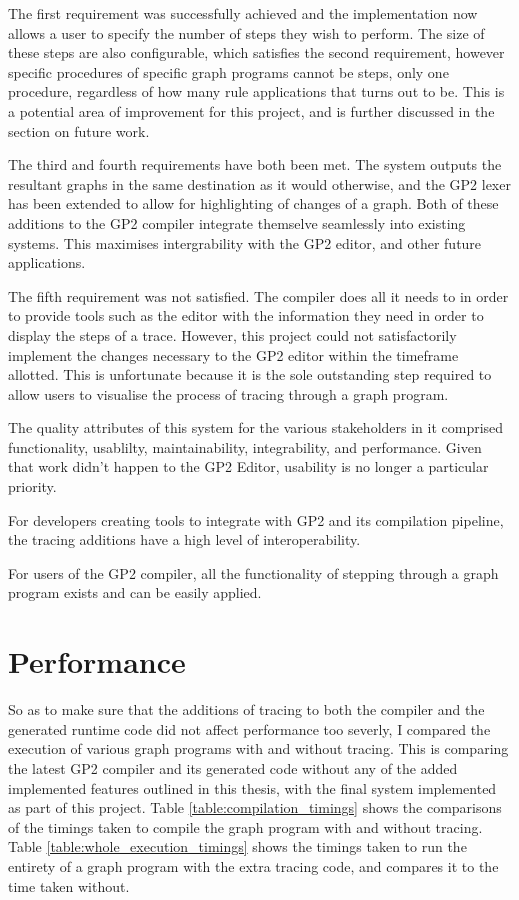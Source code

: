 \documentclass{UoYCSproject}
\begin{document}
The first requirement was successfully achieved and the implementation now allows a user to specify the number of steps they wish to perform. The size of these steps are also configurable, which satisfies the second requirement, however specific procedures of specific graph programs cannot be steps, only one procedure, regardless of how many rule applications that turns out to be. This is a potential area of improvement for this project, and is further discussed in the section on future work. %

The third and fourth requirements have both been met. The system outputs the resultant graphs in the same destination as it would otherwise, and the GP2 lexer has been extended to allow for highlighting of changes of a graph. Both of these additions to the GP2 compiler integrate themselve seamlessly into existing systems. This maximises intergrability with the GP2 editor, and other future applications.

The fifth requirement was not satisfied. The compiler does all it needs to in order to provide tools such as the editor with the information they need in order to display the steps of a trace. However, this project could not satisfactorily implement the changes necessary to the GP2 editor within the timeframe allotted. This is unfortunate because it is the sole outstanding step required to allow users to visualise the process of tracing through a graph program.

The quality attributes of this system for the various stakeholders in it comprised functionality, usablilty, maintainability, integrability, and performance. Given that work didn't happen to the GP2 Editor, usability is no longer a particular priority.

For developers creating tools to integrate with GP2 and its compilation pipeline, the tracing additions have a high level of interoperability.

For users of the GP2 compiler, all the functionality of stepping through a graph program exists and can be easily applied.

\section{Performance}

So as to make sure that the additions of tracing to both the compiler and the generated runtime code did not affect performance too severly, I compared the execution of various graph programs with and without tracing. This is comparing the latest GP2 compiler and its generated code without any of the added implemented features outlined in this thesis, with the final system implemented as part of this project. Table \ref{table:compilation_timings} shows the comparisons of the timings taken to compile the graph program with and without tracing. Table \ref{table:whole_execution_timings} shows the timings taken to run the entirety of a graph program with the extra tracing code, and compares it to the time taken without.
\end{document}
